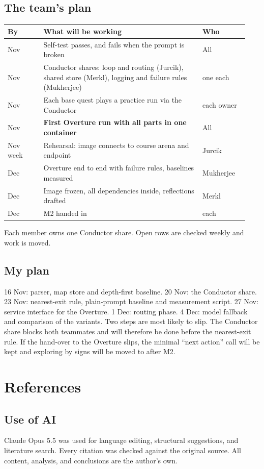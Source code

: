 \documentclass[11pt,a4paper]{article}
\newcommand\Imp{Jurcik}     %
\newcommand\Mus{Merkl}   %
\newcommand\Pla{Mukherjee}         %
\begin{document}
\subsection{The team's plan}

\begin{tabular}{@{}>{\raggedright\arraybackslash}p{0.14\linewidth}>{\raggedright\arraybackslash}p{0.62\linewidth}>{\raggedright\arraybackslash}p{0.18\linewidth}@{}}
\hline
\textbf{By} & \textbf{What will be working} & \textbf{Who} \\
\hline
16 Nov & Self-test passes, and fails when the prompt is broken & All \\
20 Nov & Conductor shares: loop and routing (\Imp), shared store (\Mus), logging and failure rules (\Pla) & one each \\
23 Nov & Each base quest plays a practice run via the Conductor & each owner \\
27 Nov & \textbf{First Overture run with all parts in one container} & All \\
30 Nov week & Rehearsal: image connects to course arena and endpoint & \Imp \\
4 Dec & Overture end to end with failure rules, baselines measured & \Pla \\
8 Dec & Image frozen, all dependencies inside, reflections drafted & \Mus \\
10 Dec & M2 handed in & each \\
\hline
\end{tabular}

Each member owns one Conductor share. Open rows are checked weekly and work is moved.

\subsection{My plan}

16 Nov: parser, map store and depth-first baseline. 20 Nov: the Conductor share. 23 Nov: nearest-exit rule,
plain-prompt baseline and measurement script. 27 Nov: service interface for the Overture. 1 Dec: routing
phase. 4 Dec: model fallback and comparison of the variants. Two steps are most likely to slip.
The Conductor share blocks both teammates and will therefore be done before the nearest-exit rule. If the
hand-over to the Overture slips, the minimal \enquote{next action} call will be kept and exploring by signs
will be moved to after M2.

\section*{References}

{\sloppy\printbibliography[heading=none]}

\subsection*{Use of AI}
Claude Opus 5.5 was used for language editing, structural suggestions, and literature search. Every citation was checked against the original source. All content, analysis, and conclusions are the author's own.
\end{document}
